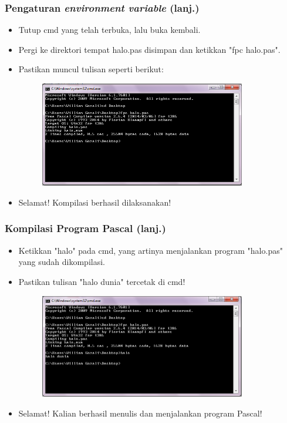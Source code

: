 \documentclass{beamer}
\begin{document}
\begin{frame}
\frametitle{Pengaturan \textit{environment variable} (lanj.)}
\begin{itemize}
	\item Tutup cmd yang telah terbuka, lalu buka kembali.
	\item Pergi ke direktori tempat halo.pas disimpan dan ketikkan "fpc halo.pas".
	\item Pastikan muncul tulisan seperti berikut:
	\begin{figure}
		\includegraphics[width=9cm]{asset/hello_3.PNG}
	\end{figure}
	\item Selamat! Kompilasi berhasil dilaksanakan!
\end{itemize}
\end{frame}

\begin{frame}
\frametitle{Kompilasi Program Pascal (lanj.)}
\begin{itemize}
	\item Ketikkan "halo" pada cmd, yang artinya menjalankan program "halo.pas" yang sudah dikompilasi.
	\item Pastikan tulisan "halo dunia" tercetak di cmd!
	\begin{figure}
		\includegraphics[width=9cm]{asset/hello_4.PNG}
	\end{figure}
	\item Selamat! Kalian berhasil menulis dan menjalankan program Pascal!
\end{itemize}
\end{frame}
\end{document}
